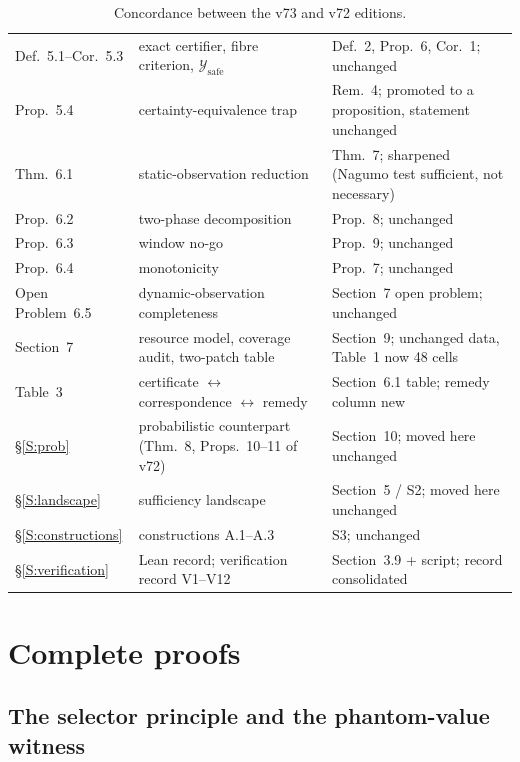 \documentclass[11pt,a4paper]{article}
\theoremstyle{plain}
\theoremstyle{definition}
\theoremstyle{remark}
\newcommand{\cY}{\mathcal{Y}}
\begin{document}
\begin{table}[htbp]
\begin{tabularx}{\textwidth}{@{}l>{\raggedright\arraybackslash}X>{\raggedright\arraybackslash}X@{}}
Def.~5.1--Cor.~5.3 & exact certifier, fibre criterion, $\cY_{\mathrm{safe}}$ & Def.~2, Prop.~6, Cor.~1; unchanged\\
Prop.~5.4 & certainty-equivalence trap & Rem.~4; promoted to a proposition, statement unchanged\\
Thm.~6.1 & static-observation reduction & Thm.~7; sharpened (Nagumo test sufficient, not necessary)\\
Prop.~6.2 & two-phase decomposition & Prop.~8; unchanged\\
Prop.~6.3 & window no-go & Prop.~9; unchanged\\
Prop.~6.4 & monotonicity & Prop.~7; unchanged\\
Open Problem~6.5 & dynamic-observation completeness & Section~7 open problem; unchanged\\
Section~7 & resource model, coverage audit, two-patch table & Section~9; unchanged data, Table~1 now 48 cells\\
Table~3 & certificate $\leftrightarrow$ correspondence $\leftrightarrow$ remedy & Section~6.1 table; remedy column new\\
\S\ref{S:prob} & probabilistic counterpart (Thm.~8, Props.~10--11 of v72) & Section~10; moved here unchanged\\
\S\ref{S:landscape} & sufficiency landscape & Section~5 / S2; moved here unchanged\\
\S\ref{S:constructions} & constructions A.1--A.3 & S3; unchanged\\
\S\ref{S:verification} & Lean record; verification record V1--V12 & Section~3.9 + script; record consolidated\\
\bottomrule
\end{tabularx}
\caption{Concordance between the v73 and v72 editions.}
\label{tab:concordance}
\end{table}
\section{Complete proofs}\label{S:proofs}

\subsection{The selector principle and the phantom-value witness}\label{S:selector}
\end{document}
